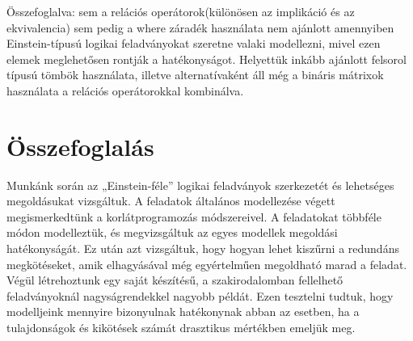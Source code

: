 \documentclass[12pt,a4paper,twoside, openright]{report}
\begin{document}
    Összefoglalva: sem a relációs operátorok(különösen az implikáció és az ekvivalencia) sem pedig a where záradék használata nem ajánlott amennyiben Einstein-típusú logikai feladványokat szeretne valaki modellezni, mivel ezen elemek meglehetősen rontják a hatékonyságot. Helyettük inkább ajánlott felsorol típusú tömbök használata, illetve alternatívaként áll még a bináris mátrixok használata a relációs operátorokkal kombinálva.


\chapter{Összefoglalás}

    Munkánk során az „Einstein-féle” logikai feladványok szerkezetét és lehetséges megoldásukat vizsgáltuk.
    A feladatok általános modellezése végett megismerkedtünk a korlátprogramozás módszereivel.
    A feladatokat többféle módon modelleztük, és megvizsgáltuk az egyes modellek megoldási hatékonyságát.
    Ez után azt vizsgáltuk, hogy hogyan lehet kiszűrni a redundáns megkötéseket, amik elhagyásával még egyértelműen megoldható marad a feladat. Végül létrehoztunk egy saját készítésű, a szakirodalomban fellelhető feladványoknál nagyságrendekkel nagyobb példát. Ezen tesztelni tudtuk, hogy modelljeink mennyire bizonyulnak hatékonynak abban az esetben, ha a tulajdonságok és kikötések számát drasztikus mértékben emeljük meg.
			


				
				
\end{document}
